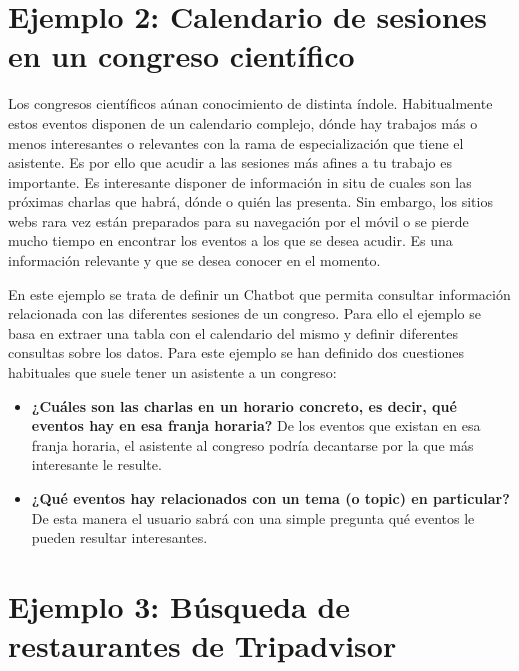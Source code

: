 \section{Ejemplo 2: Calendario de sesiones en un congreso científico}

Los congresos científicos aúnan conocimiento de distinta índole. Habitualmente estos eventos disponen de un calendario complejo, dónde hay trabajos más o menos interesantes o relevantes con la rama de especialización que tiene el asistente. Es por ello que acudir a las sesiones más afines a tu trabajo es importante. Es interesante disponer de información in situ de cuales son las próximas charlas que habrá, dónde o quién las presenta. Sin embargo, los sitios webs rara vez están preparados para su navegación por el móvil o se pierde mucho tiempo en encontrar los eventos a los que se desea acudir. Es una información relevante y que se desea conocer en el momento. 

En este ejemplo se trata de definir un Chatbot que permita consultar información relacionada con las diferentes sesiones de un congreso. Para ello el ejemplo se basa en extraer una tabla con el calendario del mismo y definir diferentes consultas sobre los datos. Para este ejemplo se han definido dos cuestiones habituales que suele tener un asistente a un congreso: 
\begin{itemize}
	\item \textbf{¿Cuáles son las charlas en un horario concreto, es decir, qué eventos hay en esa franja horaria?} De los eventos que existan en esa franja horaria, el asistente al congreso podría decantarse por la que más interesante le resulte.
	\item \textbf{¿Qué eventos hay relacionados con un tema (o topic) en particular?} De esta manera el usuario sabrá con una simple pregunta qué eventos le pueden resultar interesantes.
\end{itemize}



\section{Ejemplo 3: Búsqueda de restaurantes de Tripadvisor}


